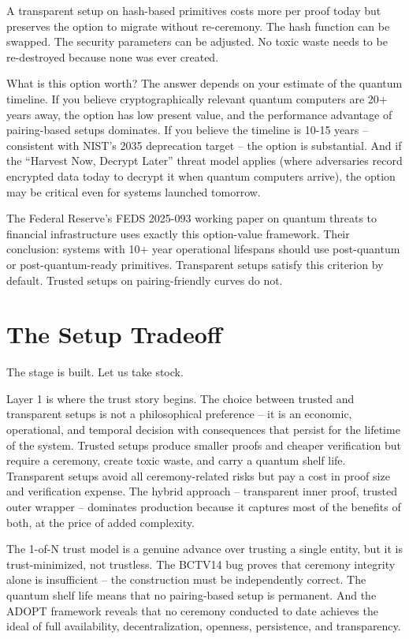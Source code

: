 \documentclass[
  11pt,
  openany]{report}
\begin{document}
A transparent setup on hash-based primitives costs more per proof today but
preserves the option to migrate without re-ceremony. The hash function can be
swapped. The security parameters can be adjusted. No toxic waste needs to be
re-destroyed because none was ever created.

What is this option worth? The answer depends on your estimate of the quantum
timeline. If you believe cryptographically relevant quantum computers are 20+
years away, the option has low present value, and the performance advantage of
pairing-based setups dominates. If you believe the timeline is 10-15 years --
consistent with NIST's 2035 deprecation target -- the option is substantial. And
if the ``Harvest Now, Decrypt Later'' threat model applies (where adversaries
record encrypted data today to decrypt it when quantum computers arrive), the
option may be critical even for systems launched tomorrow.

The Federal Reserve's FEDS 2025-093 working paper on quantum threats to
financial infrastructure uses exactly this option-value framework. Their
conclusion: systems with 10+ year operational lifespans should use post-quantum
or post-quantum-ready primitives. Transparent setups satisfy this criterion by
default. Trusted setups on pairing-friendly curves do not.

\section{The Setup Tradeoff}\label{the-setup-tradeoff}

The stage is built. Let us take stock.

Layer 1 is where the trust story begins. The choice between trusted and
transparent setups is not a philosophical preference -- it is an economic,
operational, and temporal decision with consequences that persist for the
lifetime of the system. Trusted setups produce smaller proofs and cheaper
verification but require a ceremony, create toxic waste, and carry a quantum
shelf life. Transparent setups avoid all ceremony-related risks but pay a cost
in proof size and verification expense. The hybrid approach -- transparent inner
proof, trusted outer wrapper -- dominates production because it captures most of
the benefits of both, at the price of added complexity.

The 1-of-N trust model is a genuine advance over trusting a single entity, but
it is trust-minimized, not trustless. The BCTV14 bug proves that ceremony
integrity alone is insufficient -- the construction must be independently
correct. The quantum shelf life means that no pairing-based setup is permanent.
And the ADOPT framework reveals that no ceremony conducted to date achieves the
ideal of full availability, decentralization, openness, persistence, and
transparency.
\end{document}
